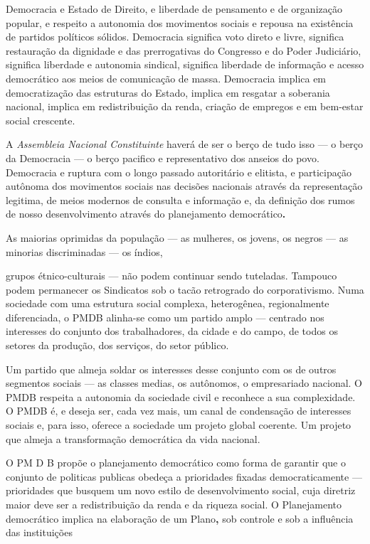 Democracia e Estado de Direito, e liberdade de pensamento e de
organização popular, e respeito a autonomia dos movimentos sociais e
repousa na existência de partidos políticos sólidos. Democracia
significa voto direto e livre, significa restauração da dignidade e das
prerrogativas do Congresso e do Poder Judiciário, significa liberdade e
autonomia sindical, significa liberdade de informação e acesso
democrático aos meios de comunicação de massa. Democracia implica em
democratização das estruturas do Estado, implica em resgatar a soberania
nacional, implica em redistribuição da renda, criação de empregos e em
bem-estar social crescente.

A \emph{Assembleia Nacional Constituinte} haverá de ser o berço de tudo
isso --- o berço da Democracia --- o berço pacifico e representativo dos
anseios do povo. Democracia e ruptura com o longo passado autoritário e
elitista, e participação autônoma dos movimentos sociais nas decisões
nacionais através da representação legitima, de meios modernos de
consulta e informação e, da definição dos rumos de nosso desenvolvimento
através do planejamento democrático\textbf{. }

As maiorias oprimidas da população --- as mulheres, os jovens, os negros
--- as minorias discriminadas --- os índios,

grupos étnico-culturais --- não podem continuar sendo tuteladas.
Tampouco podem permanecer os Sindicatos sob o tacão retrogrado do
corporativismo. Numa sociedade com uma estrutura social complexa,
heterogênea, regionalmente diferenciada, o PMDB alinha-se como um
partido amplo --- centrado nos interesses do conjunto dos trabalhadores,
da cidade e do campo, de todos os setores da produção, dos serviços, do
setor público.

Um partido que almeja soldar os interesses desse conjunto com os de
outros segmentos sociais --- as classes medias, os autônomos, o
empresariado nacional. O PMDB respeita a autonomia da sociedade civil e
reconhece a sua complexidade. O PMDB é, e deseja ser, cada vez mais, um
canal de condensação de interesses sociais e, para isso, oferece a
sociedade um projeto global coerente. Um projeto que almeja a
transformação democrática da vida nacional.

O PM D B propõe o planejamento democrático como forma de garantir que o
conjunto de politicas publicas obedeça a prioridades fixadas
democraticamente --- prioridades que busquem um novo estilo de
desenvolvimento social, cuja diretriz maior deve ser a redistribuição da
renda e da riqueza social. O Planejamento democrático implica na
elaboração de um Plano\textbf{,} sob controle e sob a influência das
instituições

